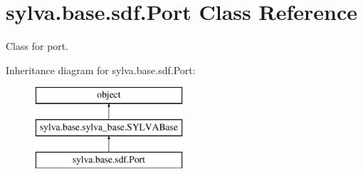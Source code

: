\hypertarget{classsylva_1_1base_1_1sdf_1_1_port}{}\section{sylva.\+base.\+sdf.\+Port Class Reference}
\label{classsylva_1_1base_1_1sdf_1_1_port}


Class for port.  


Inheritance diagram for sylva.\+base.\+sdf.\+Port\+:\begin{figure}[H]
\begin{center}
\leavevmode
\includegraphics[height=3.000000cm]{classsylva_1_1base_1_1sdf_1_1_port}
\end{center}
\end{figure}
